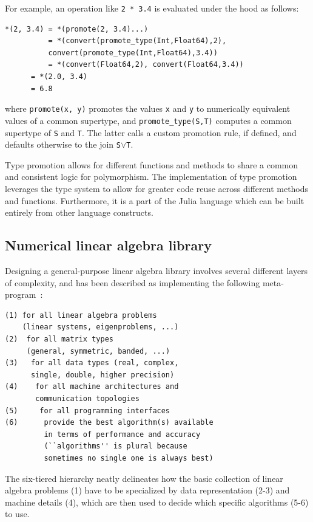 \documentclass[pldi]{sigplanconf-pldi15}
\begin{document}
For example, an operation like \verb|2 * 3.4| is evaluated under the hood as
follows:

\begin{lstlisting}
*(2, 3.4) = *(promote(2, 3.4)...)
          = *(convert(promote_type(Int,Float64),2),
	      convert(promote_type(Int,Float64),3.4))
          = *(convert(Float64,2), convert(Float64,3.4))
	  = *(2.0, 3.4)
	  = 6.8
\end{lstlisting}
%
where \verb|promote(x, y)| promotes the values \verb|x| and \verb|y| to
numerically equivalent values of a common supertype, and
\verb|promote_type(S,T)| computes a common supertype of \verb|S| and \verb|T|.
The latter calls a custom promotion rule, if defined, and defaults otherwise to
the join \verb|S|$\vee$\verb|T|.

Type promotion allows for different functions and methods to share a common and
consistent logic for polymorphism. The implementation of type promotion
leverages the type system to allow for greater code reuse across different
methods and functions. Furthermore, it is a part of the Julia language which
can be built entirely from other language constructs.


\subsection{Numerical linear algebra library}

Designing a general-purpose linear algebra library involves several different
layers of complexity, and has been described as implementing the following
meta-program~\cite{Demmel2007}:

{\small
\begin{verbatim}
(1) for all linear algebra problems
    (linear systems, eigenproblems, ...)
(2)  for all matrix types
     (general, symmetric, banded, ...)
(3)   for all data types (real, complex,
      single, double, higher precision)
(4)    for all machine architectures and
       communication topologies
(5)     for all programming interfaces
(6)      provide the best algorithm(s) available
         in terms of performance and accuracy
         (``algorithms'' is plural because
         sometimes no single one is always best)
\end{verbatim}
}
%
The six-tiered hierarchy neatly delineates how the basic collection of linear
algebra problems (1) have to be specialized by data representation (2-3) and
machine details (4), which are then used to decide which specific algorithms
(5-6) to use.
\end{document}
